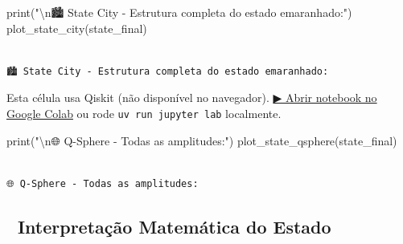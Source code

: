 \documentclass[
  brazilian,
]{report}
\newenvironment{Shaded}{\begin{snugshade}}{\end{snugshade}}
\newcommand{\BuiltInTok}[1]{\textcolor[rgb]{0.00,0.23,0.31}{#1}}
\newcommand{\CharTok}[1]{\textcolor[rgb]{0.13,0.47,0.30}{#1}}
\newcommand{\NormalTok}[1]{\textcolor[rgb]{0.00,0.23,0.31}{#1}}
\newcommand{\StringTok}[1]{\textcolor[rgb]{0.13,0.47,0.30}{#1}}
\begin{document}
\begin{Shaded}
\begin{Highlighting}[]

\NormalTok{print("\textbackslash{}n🏙️ State City {-} Estrutura completa do estado emaranhado:")}
\NormalTok{plot\_state\_city(state\_final)}
\end{Highlighting}
\end{Shaded}

\begin{verbatim}

🏙️ State City - Estrutura completa do estado emaranhado:
\end{verbatim}

\begin{tcolorbox}[enhanced jigsaw, arc=.35mm, bottomrule=.15mm, bottomtitle=1mm, breakable, colback=white, colbacktitle=quarto-callout-warning-color!10!white, colframe=quarto-callout-warning-color-frame, coltitle=black, left=2mm, leftrule=.75mm, opacityback=0, opacitybacktitle=0.6, rightrule=.15mm, title=\textcolor{quarto-callout-warning-color}{\faExclamationTriangle}\hspace{0.5em}{⚛️ Célula Qiskit --- execute no Colab ou localmente}, titlerule=0mm, toprule=.15mm, toptitle=1mm]

Esta célula usa Qiskit (não disponível no navegador).
\href{https://colab.research.google.com/github/maxwellamaral/aula-quantum/blob/main/notebooks/02-teletransport.ipynb}{▶
Abrir notebook no Google Colab} ou rode \texttt{uv\ run\ jupyter\ lab}
localmente.

\begin{Shaded}
\begin{Highlighting}[]

\BuiltInTok{print}\NormalTok{(}\StringTok{"}\CharTok{\textbackslash{}n}\StringTok{🌐 Q{-}Sphere {-} Todas as amplitudes:"}\NormalTok{)}
\NormalTok{plot\_state\_qsphere(state\_final)}
\end{Highlighting}
\end{Shaded}

\end{tcolorbox}

\begin{verbatim}

🌐 Q-Sphere - Todas as amplitudes:
\end{verbatim}

\subsection{📐 Interpretação Matemática do
Estado}\label{interpretauxe7uxe3o-matemuxe1tica-do-estado}
\end{document}
